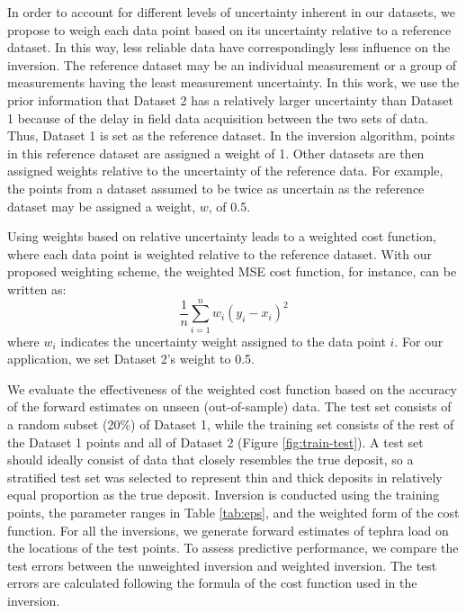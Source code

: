 In order to account for different levels of uncertainty inherent in our datasets, we propose to weigh each data point based on its uncertainty relative to a reference dataset. In this way, less reliable data have correspondingly less influence on the inversion. The reference dataset may be an individual measurement or a group of measurements having the least measurement uncertainty. In this work, we use the prior information that Dataset 2 has a relatively larger uncertainty than Dataset 1 because of the delay in field data acquisition between the two sets of data. Thus, Dataset 1 is set as the reference dataset. In the inversion algorithm, points in this reference dataset are assigned a weight of 1. Other datasets are then assigned weights relative to the uncertainty of the reference data. For example, the points from a dataset assumed to be twice as uncertain as the reference dataset may be assigned a weight, $w$, of 0.5. 

Using weights based on relative uncertainty leads to a weighted cost function, where each data point is weighted relative to the reference dataset. With our proposed weighting scheme, the weighted MSE cost function, for instance, can be written as:
\begin{equation}
\frac{1}{n} \sum_{i=1}^{n} w_{i} (y_{i} - x_{i})^{2}
\end{equation}
where $w_{i}$ indicates the uncertainty weight assigned to the data point $i$. For our application, we set Dataset 2's weight to 0.5. 

We evaluate the effectiveness of the weighted cost function based on the accuracy of the forward estimates on unseen (out-of-sample) data. The test set consists of a random subset (20\%) of Dataset 1, while the training set consists of the rest of the Dataset 1 points and all of Dataset 2 (Figure \ref{fig:train-test}). A test set should ideally consist of data that closely resembles the true deposit, so a stratified test set was selected to represent thin and thick deposits in relatively equal proportion as the true deposit. Inversion is conducted using the training points, the parameter ranges in Table \ref{tab:eps}, and the weighted form of the cost function. For all the inversions, we generate forward estimates of tephra load on the locations of the test points. To assess predictive performance, we compare the test errors between the unweighted inversion and weighted inversion. The test errors are calculated following the formula of the cost function used in the inversion.


